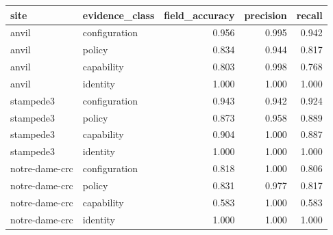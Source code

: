 \begin{tabular}{llrrr}
\toprule
site & evidence_class & field_accuracy & precision & recall \\
\midrule
anvil & configuration & 0.956 & 0.995 & 0.942 \\
anvil & policy & 0.834 & 0.944 & 0.817 \\
anvil & capability & 0.803 & 0.998 & 0.768 \\
anvil & identity & 1.000 & 1.000 & 1.000 \\
stampede3 & configuration & 0.943 & 0.942 & 0.924 \\
stampede3 & policy & 0.873 & 0.958 & 0.889 \\
stampede3 & capability & 0.904 & 1.000 & 0.887 \\
stampede3 & identity & 1.000 & 1.000 & 1.000 \\
notre-dame-crc & configuration & 0.818 & 1.000 & 0.806 \\
notre-dame-crc & policy & 0.831 & 0.977 & 0.817 \\
notre-dame-crc & capability & 0.583 & 1.000 & 0.583 \\
notre-dame-crc & identity & 1.000 & 1.000 & 1.000 \\
\bottomrule
\end{tabular}
